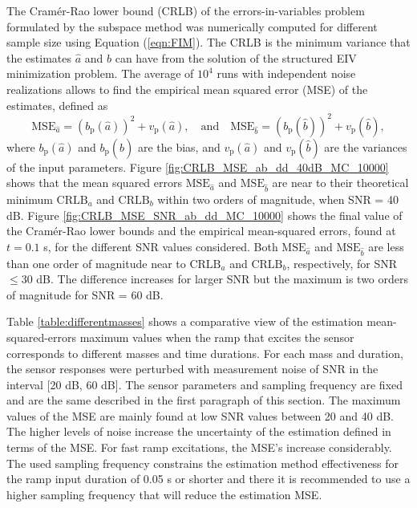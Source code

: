 {{The Cram\'er-Rao lower bound (CRLB) of the errors-in-variables problem formulated by the subspace method was numerically computed for different sample size using Equation (\ref{eqn:FIM}).
The CRLB is the minimum variance that the estimates $\widehat{a}$ and $\widehat{b}$ can have from the solution of the structured EIV minimization problem. 
The average of $10^4$ runs with independent noise realizations allows to find the empirical mean squared error (MSE) of the estimates, defined as
\begin{equation} \mathrm{MSE}_{\widehat{a}} = \left(b_{\mathrm{p}}\left( \widehat{a} \right) \right)^2 + v_{\mathrm{p}} \left( \widehat{a} \right), \quad \text{and} \quad  \mathrm{MSE}_{\widehat{b}} = ( b_{\mathrm{p}} ( \widehat{b} ) )^2 + v_{\mathrm{p}} ( \widehat{b} ), \end{equation}
where $b_{\mathrm{p}} \left( \widehat{a} \right)$ and $b_{\mathrm{p}} ( \widehat{b} )$ are the bias, and $v_{\mathrm{p}} \left( \widehat{a} \right)$ and $v_{\mathrm{p}} ( \widehat{b} )$ are the variances of the input parameters.
Figure \ref{fig:CRLB_MSE_ab_dd_40dB_MC_10000} shows that the mean squared errors $\mathrm{MSE}_{\hat{a}}$ and $\mathrm{MSE}_{\hat{b}}$ are near to their theoretical minimum $\mathrm{CRLB}_{a}$ and $\mathrm{CRLB}_{b}$ within two orders of magnitude, when SNR = 40 dB.
Figure \ref{fig:CRLB_MSE_SNR_ab_dd_MC_10000} shows the final value of the Cram\'er-Rao lower bounds and the empirical mean-squared errors, found at $t=0.1$ s, for the different SNR values considered.
Both $\mathrm{MSE}_{\hat{a}}$ and $\mathrm{MSE}_{\hat{b}}$ are less than one order of magnitude near to $\mathrm{CRLB}_a$ and $\mathrm{CRLB}_{b}$, respectively, for SNR $\leq 30$ dB.
The difference increases for larger SNR but the maximum is two orders of magnitude for SNR = 60 dB.

Table \ref{table:differentmasses} shows a comparative view of the estimation mean-squared-errors maximum values when the ramp that excites the sensor corresponds to different masses and time durations. 
For each mass and duration, the sensor responses were perturbed with measurement noise of SNR in the interval [20 dB, 60 dB].
The sensor parameters and sampling frequency are fixed and are the same described in the first paragraph of this section.
The maximum values of the MSE are mainly found at low SNR values between 20 and 40 dB.
The higher levels of noise increase the uncertainty of the estimation defined in terms of the MSE.
For fast ramp excitations, the MSE's increase considerably.
The used sampling frequency constrains the estimation method effectiveness for the ramp input duration of 0.05 s or shorter and there it is recommended to use  a higher sampling frequency that will reduce the estimation MSE.


}}
